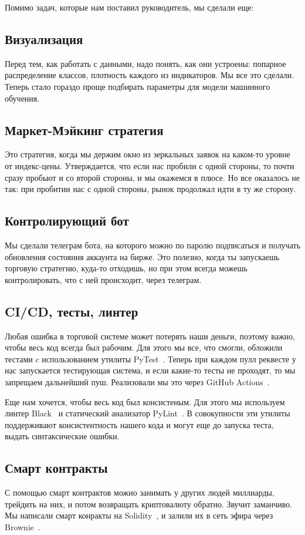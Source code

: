 \documentclass{article}
\begin{document}
Помимо задач, которые нам поставил руководитель, мы сделали еще:

\subsection{Визуализация}
Перед тем, как работать с данными, надо понять, как они устроены: попарное распределение классов, плотность каждого из индикаторов. Мы все это сделали. Теперь стало гораздо проще подбирать параметры для модели машинного обучения.

\subsection{Маркет-Мэйкинг стратегия}
Это стратегия, когда мы держим окно из зеркальных заявок на каком-то уровне от индекс-цены. Утверждается, что если нас пробили с одной стороны, то почти сразу пробьют и со второй стороны, и мы окажемся в плюсе. Но все оказалось не так: при пробитии нас с одной стороны, рынок продолжал идти в ту же сторону.

\subsection{Контролирующий бот}
Мы сделали телеграм бота, на которого можно по паролю подписаться и получать обновления состояния аккаунта на бирже. Это полезно, когда ты запускаешь торговую стратегию, куда-то отходишь, но при этом всегда можешь контролировать, что с ней происходит, через телеграм.

\subsection{CI/CD, тесты, линтер}
Любая ошибка в торговой системе может потерять наши деньги, поэтому важно, чтобы весь код всегда был рабочим. Для этого мы все, что смогли, обложили тестами c использованием утилиты PyTest~\cite{Pytest}. Теперь при каждом пулл реквесте у нас запускается тестирующая система, и если какие-то тесты не проходят, то мы запрещаем дальнейший пуш. Реализовали мы это через GitHub Actions~\cite{GitHubActions}.

Еще нам хочется, чтобы весь код был консистеным. Для этого мы используем линтер Black~\cite{Black} и статический анализатор PyLint~\cite{Pylint}. В совокупности эти утилиты поддерживают консистентность нашего кода и могут еще до запуска теста, выдать синтаксические ошибки.

\subsection{Смарт контракты}
С помощью смарт контрактов можно занимать у других людей миллиарды, трейдить на них, и потом возвращать криптовалюту обратно. Звучит заманчиво. Мы написали смарт конракты на Solidity~\cite{Solidity}, и залили их в сеть эфира через Brownie~\cite{Brownie}.






\end{document}

